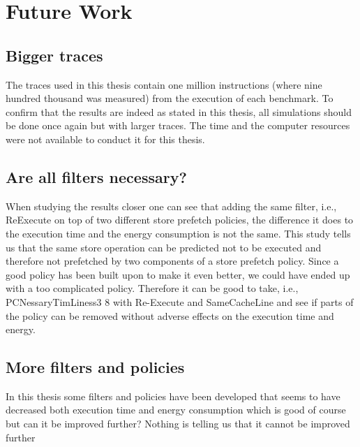 \chapter{Future Work}
\label{chap:fetueredWork}

\section{Bigger traces}
The traces used in this thesis contain one million instructions (where nine hundred
thousand was measured) from the execution of each benchmark. To confirm that the
results are indeed as stated in this thesis, all simulations should be done once again
but with larger traces. The time and the computer resources were not available to
conduct it for this thesis.
\section{Are all filters necessary?}
When studying the results closer one can see that adding the same filter, i.e., ReExecute on top of two different store prefetch policies, the difference it does to the
execution time and the energy consumption is not the same. This study tells us
that the same store operation can be predicted not to be executed and therefore
not prefetched by two components of a store prefetch policy. Since a good policy
has been built upon to make it even better, we could have ended up with a too
complicated policy. Therefore it can be good to take, i.e., PCNessaryTimLiness3 8
with Re-Execute and SameCacheLine and see if parts of the policy can be removed
without adverse effects on the execution time and energy.
\section{More filters and policies}
In this thesis some filters and policies have been developed that seems to have decreased both execution time and energy consumption which is good of course but can
it be improved further? Nothing is telling us that it cannot be improved further

